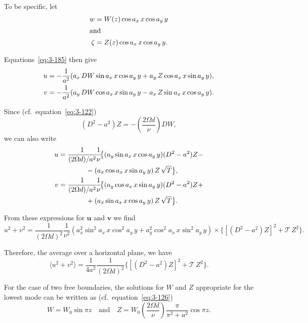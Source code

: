 To be specific, let
\begin{align}
w &= W(z)\cos a_x\, x\cos a_y\, y \label{eq:3-186}\\
\intertext{and}
\zeta &= Z(z)\cos a_x\, x\cos a_y\, y. \notag
\end{align}

Equations~\eqref{eq:3-185} then give
\begin{align}
\mathbf{u} &= -\frac{1}{a^2}(a_x\,DW\sin a_x\, x\cos a_y\, y + a_y\,Z\cos a_x\, x\sin a_y\, y), \notag\\
\mathbf{v} &= -\frac{1}{a^2}(a_y\,DW\cos a_x\, x\sin a_y\, y - a_x\,Z\sin a_x\, x\cos a_y\, y). \label{eq:3-187}
\end{align}

Since (cf.\ equation~\eqref{eq:3-122})
\begin{equation}\label{eq:3-188}
(D^2 - a^2)Z = -\left(\frac{2\Omega d}{\nu}\right)\!DW,
\end{equation}
we can also write
\begin{align}
\mathbf{u} &= \frac{1}{(2\Omega d)/a^2}\!\frac{1}{\nu}\!\bigl\{(a_y\sin a_x\, x\cos a_y\, y)(D^2 - a^2)Z - \notag\\
&\qquad\qquad - (a_x\cos a_x\, x\sin a_y\, y)\,Z\,\sqrt{\mathscr{T}}\bigr\}, \notag\\
\mathbf{v} &= \frac{1}{(2\Omega d)/a^2}\!\frac{1}{\nu}\!\bigl\{(a_y\cos a_x\, x\sin a_y\, y)(D^2 - a^2)Z + \notag\\
&\qquad\qquad + (a_x\sin a_x\, x\cos a_y\, y)\,Z\,\sqrt{\mathscr{T}}\bigr\}. \label{eq:3-189}
\end{align}

From these expressions for $\mathbf{u}$ and $\mathbf{v}$ we find
\begin{equation}\label{eq:3-190}
u^2 + v^2 = \frac{1}{(2\Omega d)^2}\!\frac{1}{\nu^2}(a_x^2\sin^2\!a_x\, x\cos^2\!a_y\, y + a_y^2\cos^2\!a_x\, x\sin^2\!a_y\, y)\times\bigl\{[(D^2 - a^2)Z]^2 + \mathscr{T}\,Z^2\bigr\}.
\end{equation}

Therefore, the average over a horizontal plane, we have
\begin{equation}\label{eq:3-191}
\langle u^2 + v^2\rangle = \frac{1}{4a^2}\frac{1}{(2\Omega d)^2}\bigl\{[(D^2 - a^2)Z]^2 + \mathscr{T}\,Z^2\bigr\}.
\end{equation}

For the case of two free boundaries, the solutions for $W$ and $Z$ appropriate for the lowest mode can be written as (cf.\ equation~\eqref{eq:3-126})
\begin{equation}\label{eq:3-192}
W = W_0\sin\pi z \quad \text{and} \quad Z = W_0\!\left(\frac{2\Omega d}{\nu}\right)\!\frac{\pi}{\pi^2 + a^2}\cos\pi z.
\end{equation}

